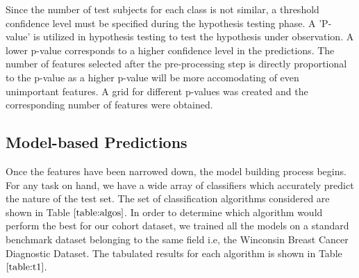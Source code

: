 \documentclass[10pt,journal,compsoc]{IEEEtran}
\begin{document}
Since the number of test subjects for each class is not similar, a threshold confidence level must be specified during the hypothesis testing phase. A 'P-value' is utilized in hypothesis testing to test the hypothesis under observation. A lower p-value corresponds to a higher confidence level in the predictions. The number of features selected after the pre-processing step is directly proportional to the p-value as a higher p-value will be more accomodating of even unimportant features. A grid for different p-values was created and the corresponding number of features were obtained.   

\subsection{Model-based Predictions}

Once the features have been narrowed down, the model building process begins. For any task on hand, we have a wide array of classifiers which accurately predict the nature of the test set. The set of classification algorithms considered are shown in Table $\ref{table:algos}$. In order to determine which algorithm would perform the best for our cohort dataset, we trained all the models on a standard benchmark dataset belonging to the same field i.e, the Winconsin Breast Cancer Diagnostic Dataset. The tabulated results for each algorithm is shown in Table $\ref{table:t1}$.
\end{document}
